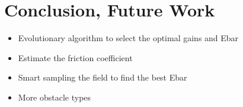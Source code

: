 \section{Conclusion, Future Work}
\begin{itemize}
    \item Evolutionary algorithm to select the optimal gains and Ebar
    \item Estimate the friction coefficient
    \item Smart sampling the field to find the best Ebar
    \item More obstacle types
\end{itemize}